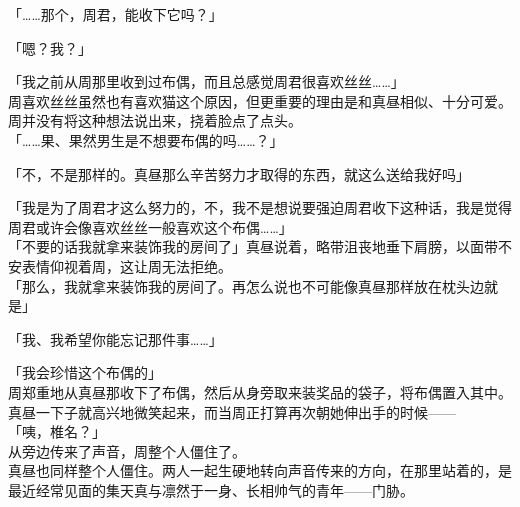 「……那个，周君，能收下它吗？」

「嗯？我？」

「我之前从周那里收到过布偶，而且总感觉周君很喜欢丝丝……」\\

周喜欢丝丝虽然也有喜欢猫这个原因，但更重要的理由是和真昼相似、十分可爱。周并没有将这种想法说出来，挠着脸点了点头。\\

「……果、果然男生是不想要布偶的吗……？」

「不，不是那样的。真昼那么辛苦努力才取得的东西，就这么送给我好吗」

「我是为了周君才这么努力的，不，我不是想说要强迫周君收下这种话，我是觉得周君或许会像喜欢丝丝一般喜欢这个布偶……」\\

「不要的话我就拿来装饰我的房间了」真昼说着，略带沮丧地垂下肩膀，以面带不安表情仰视着周，这让周无法拒绝。\\

「那么，我就拿来装饰我的房间了。再怎么说也不可能像真昼那样放在枕头边就是」

「我、我希望你能忘记那件事……」

「我会珍惜这个布偶的」\\

周郑重地从真昼那收下了布偶，然后从身旁取来装奖品的袋子，将布偶置入其中。\\

真昼一下子就高兴地微笑起来，而当周正打算再次朝她伸出手的时候——\\

「咦，椎名？」\\

从旁边传来了声音，周整个人僵住了。\\

真昼也同样整个人僵住。两人一起生硬地转向声音传来的方向，在那里站着的，是最近经常见面的集天真与凛然于一身、长相帅气的青年——门胁。

